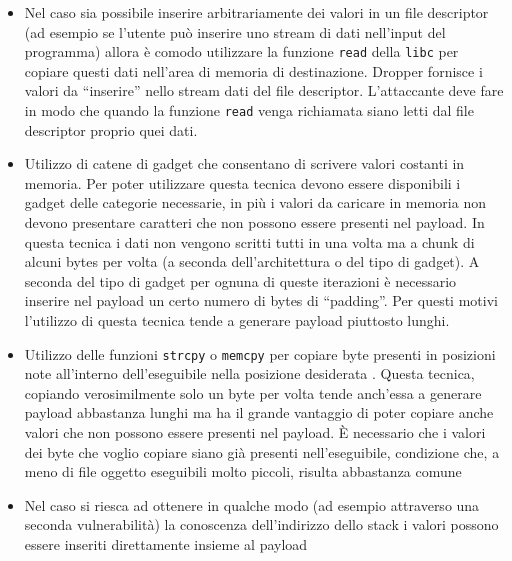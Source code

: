 \begin{itemize}

\item Nel caso sia possibile inserire arbitrariamente dei valori in un
  file descriptor (ad esempio se l'utente può inserire uno stream di
  dati nell'input del programma) allora è comodo utilizzare la
  funzione \lstinline{read} della \lstinline{libc} per copiare questi
  dati nell'area di memoria di destinazione. Dropper fornisce i valori
  da ``inserire'' nello stream dati del file descriptor. L'attaccante
  deve fare in modo che quando la funzione \lstinline{read} venga
  richiamata siano letti dal file descriptor proprio quei dati.

\item Utilizzo di catene di gadget che consentano di scrivere valori
  costanti in memoria. Per poter utilizzare questa tecnica devono
  essere disponibili i gadget delle categorie necessarie, in più i
  valori da caricare in memoria non devono presentare caratteri che
  non possono essere presenti nel payload. In questa tecnica i dati
  non vengono scritti tutti in una volta ma a chunk di alcuni bytes
  per volta (a seconda dell'architettura o del tipo di gadget). A
  seconda del tipo di gadget per ognuna di queste iterazioni è
  necessario inserire nel payload un certo numero di bytes di
  ``padding''. Per questi motivi l'utilizzo di questa tecnica tende a
  generare payload piuttosto lunghi.

\item Utilizzo delle funzioni \lstinline{strcpy} o \lstinline{memcpy}
  per copiare byte presenti in posizioni note all'interno
  dell'eseguibile nella posizione desiderata \cite{longld:2010}.
  Questa tecnica, copiando verosimilmente solo un byte per volta tende
  anch'essa a generare payload abbastanza lunghi ma ha il grande
  vantaggio di poter copiare anche valori che non possono essere
  presenti nel payload. È necessario che i valori dei byte che voglio
  copiare siano già presenti nell'eseguibile, condizione che, a meno
  di file oggetto eseguibili molto piccoli, risulta abbastanza comune

\item Nel caso si riesca ad ottenere in qualche modo (ad esempio
  attraverso una seconda vulnerabilità) la conoscenza dell'indirizzo
  dello stack i valori possono essere inseriti direttamente insieme al
  payload

\end{itemize}

